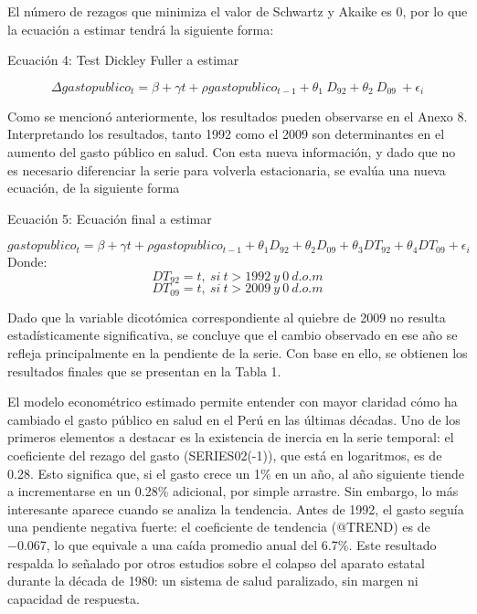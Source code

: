 \documentclass[12pt]{article}
\begin{document}
\bigskip
\bigskip
\bigskip
\bigskip
\bigskip
\bigskip
\bigskip
El número de rezagos que minimiza el valor de Schwartz y Akaike es 0, por lo que la ecuación a estimar tendrá la siguiente forma: 

\begin{center}
Ecuación 4: Test Dickley Fuller a estimar
\end{center}
\begin{equation}
\Delta gastopublico_t=\beta+\gamma t+\rho gastopublico_{t-1}+\theta_1\ D_{92}+\theta_2\ D_{09}\ +\epsilon_i
\end{equation}


Como se mencionó anteriormente, los resultados pueden observarse en el Anexo 8. Interpretando los resultados, tanto 1992 como el 2009 son determinantes en el aumento del gasto público en salud. Con esta nueva información, y dado que no es necesario diferenciar la serie para volverla estacionaria, se evalúa una nueva ecuación, de la siguiente forma

\begin{center}
Ecuación 5: Ecuación final a estimar  
\end{center}
\begin{equation}
gastopublico_t=\beta+\gamma t+\rho gastopublico_{t-1}+ \theta_1 D_{92}+\theta_2 D_{09} + \theta_3 DT_{92}+θ_4DT_{09}+ \epsilon_i
\end{equation}
Donde: 
\begin{equation*}
{DT}_{92}=t,\ si\ t>1992\ y\ 0\ d.o.m
\end{equation*}
\begin{equation*}
{DT}_{09}=t,\ si\ t>2009\ y\ 0\ d.o.m
\end{equation*}

Dado que la variable dicotómica correspondiente al quiebre de 2009 no resulta estadísticamente significativa, se concluye que el cambio observado en ese año se refleja principalmente en la pendiente de la serie. Con base en ello, se obtienen los resultados finales que se presentan en la Tabla 1.

El modelo econométrico estimado permite entender con mayor claridad cómo ha cambiado el gasto público en salud en el Perú en las últimas décadas. Uno de los primeros elementos a destacar es la existencia de inercia en la serie temporal: el coeficiente del rezago del gasto (SERIES02(-1)), que está en logaritmos, es de 0.28. Esto significa que, si el gasto crece un 1\% en un año, al año siguiente tiende a incrementarse en un 0.28\% adicional, por simple arrastre. Sin embargo, lo más interesante aparece cuando se analiza la tendencia. Antes de 1992, el gasto seguía una pendiente negativa fuerte: el coeficiente de tendencia (@TREND) es de −0.067, lo que equivale a una caída promedio anual del 6.7\%. Este resultado respalda lo señalado por otros estudios sobre el colapso del aparato estatal durante la década de 1980: un sistema de salud paralizado, sin margen ni capacidad de respuesta. 
\end{document}
